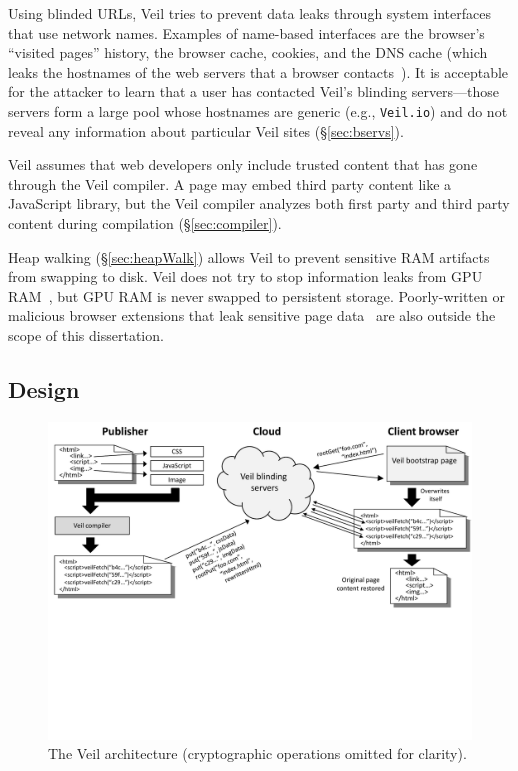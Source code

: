 Using blinded URLs, Veil tries to prevent data leaks
through system interfaces that use network names.
Examples of name-based interfaces are the browser's ``visited pages''
history, the browser cache, cookies, and the DNS
cache (which leaks the hostnames of the web servers
that a browser contacts~\cite{aggarwal10}). It is
acceptable for the attacker to learn that a user
has contacted Veil's blinding servers---those
servers form a large pool whose hostnames are generic
(e.g., \texttt{Veil.io}) and do not reveal
any information about particular Veil sites
(\S\ref{sec:bservs}).

Veil assumes that web developers only include
trusted content that has gone through the Veil
compiler.
A page may embed third party content like a JavaScript
library, but the Veil compiler analyzes both
first party and third party content during compilation
(\S\ref{sec:compiler}).

Heap walking (\S\ref{sec:heapWalk}) allows Veil
to prevent sensitive RAM artifacts from swapping to
disk. Veil does not try to stop information
leaks from GPU RAM~\cite{lee2014}, but GPU RAM
is never swapped to persistent storage. 
Poorly-written or malicious browser extensions that leak
sensitive page data~\cite{lerner13} are also outside the
scope of this dissertation.

\subsection{Design}
\label{sec:design}

\begin{figure}
	\centering
	\includegraphics[width=\textwidth]{veil-figs/arch_small_cropped}
	\caption{The Veil architecture (cryptographic operations omitted for clarity).}
	\label{fig:arch}
\end{figure}

